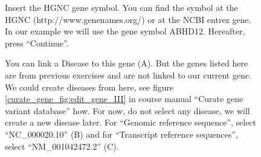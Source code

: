 \begin{figure}[ht]
  \begin{shaded}
	  \caption{Insert the HGNC gene symbol.\newline
	  You can find the symbol at the HGNC (http://www.genenames.org/) or at the NCBI entrez gene.\newline
		In our example we will use the gene symbol ABHD12. Hereafter, press ``Continue''.}
  \label{fig:create_gene_ABHD12}
  \end{shaded}
\end{figure}

\begin{figure}[ht]
  \begin{shaded}
		\caption{You can link a Disease to this gene (A). 
		But the genes listed here are from previous exercises and are not linked to our current gene. 
		We could create diseases from here, see figure \ref{curate_gene_fig:edit_gene_III} in course manual ``Curate gene 		 variant database'' how.
		For now, do not select any disease, we will create a new disease later.\newline
		For ``Genomic reference sequence'', select ``NC\_000020.10'' (B) and for ``Transcript reference sequences'',
		 select ``NM\_001042472.2'' (C).}
		\label{fig:create_gene_ABHD12_II}
  \end{shaded}
\end{figure}

